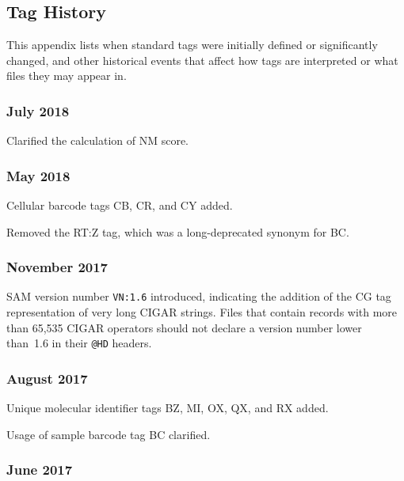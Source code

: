 \documentclass[10pt]{article}
\begin{document}
\begin{appendices}
\appendix
\section{Tag History}

This appendix lists when standard tags were initially defined or significantly changed, and other historical events that affect how tags are interpreted or what files they may appear in.

\setlength{\parindent}{0pt}
\newcommand*{\gap}{\vspace*{2ex}}

\subsubsection*{July 2018}

Clarified the calculation of NM score.

\subsubsection*{May 2018}

Cellular barcode tags CB, CR, and CY added.

Removed the RT:Z tag, which was a long-deprecated synonym for BC.

\subsubsection*{November 2017}

SAM version number {\tt VN:1.6} introduced, indicating the addition of the CG tag representation of very long CIGAR strings.
Files that contain records with more than 65,535 CIGAR operators should not declare a version number lower than~1.6 in their {\tt @HD} headers.

\subsubsection*{August 2017}

Unique molecular identifier tags BZ, MI, OX, QX, and RX added.

Usage of sample barcode tag BC clarified.

\subsubsection*{June 2017}


\end{appendices}
\end{document}
